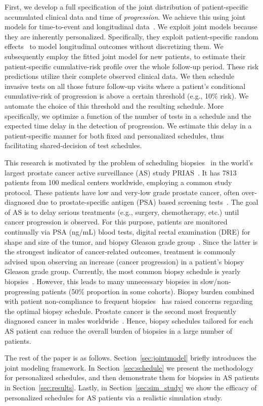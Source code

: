 First, we develop a full specification of the joint distribution of patient-specific accumulated clinical data and time of \textit{progression}. We achieve this using joint models for time-to-event and longitudinal data~\citep{tsiatis2004joint,rizopoulos2012joint}. We exploit joint models because they are inherently personalized. Specifically, they exploit patient-specific random effects~\citep{laird1982random} to model longitudinal outcomes without discretizing them. We subsequently employ the fitted joint model for new patients, to estimate their patient-specific cumulative-risk profile over the whole follow-up period. These risk predictions utilize their complete observed clinical data. We then schedule invasive tests on all those future follow-up visits where a patient's conditional cumulative-risk of progression is above a certain threshold (e.g., 10\% risk). We automate the choice of this threshold and the resulting schedule. More specifically, we optimize a function of the number of tests in a schedule and the expected time delay in the detection of progression. We estimate this delay in a patient-specific manner for both fixed and personalized schedules, thus facilitating shared-decision of test schedules.

This research is motivated by the problem of scheduling biopsies~\citep{nieboer2018active} in the world's largest prostate cancer active surveillance (AS) study PRIAS~\citep{bokhorst2016decade}. It has 7813 patients from 100 medical centers worldwide, employing a common study protocol. These patients have low and very-low grade prostate cancer, often over-diagnosed due to prostate-specific antigen (PSA) based screening tests~\citep{crawford2003epidemiology}. The goal of AS is to delay serious treatments (e.g., surgery, chemotherapy, etc.) until cancer progression is observed. For this purpose, patients are monitored continually via PSA (ng/mL) blood tests, digital rectal examination (DRE) for shape and size of the tumor, and biopsy Gleason grade group~\citep{epsteinGG2014}. Since the latter is the strongest indicator of cancer-related outcomes, treatment is commonly advised upon observing an increase (cancer progression) in a patient's biopsy Gleason grade group. Currently, the most common biopsy schedule is yearly biopsies~\citep{loeb2014heterogeneity}. However, this leads to many unnecessary biopsies in slow/non-progressing patients (50\% proportion in some cohorts). Biopsy burden combined with patient non-compliance to frequent biopsies~\citep{bokhorst2015compliance} has raised concerns regarding the optimal biopsy schedule. Prostate cancer is the second most frequently diagnosed cancer in males worldwide~\citep{GlobalCancerStats2012}. Hence, biopsy schedules tailored for each AS patient can reduce the overall burden of biopsies in a large number of patients.

The rest of the paper is as follows. Section~\ref{sec:jointmodel} briefly introduces the joint modeling framework. In Section~\ref{sec:schedule} we present the methodology for personalized schedules, and then demonstrate them for biopsies in AS patients in Section~\ref{sec:results}. Lastly, in Section~\ref{sec:sim_study} we show the efficacy of personalized schedules for AS patients via a realistic simulation study.